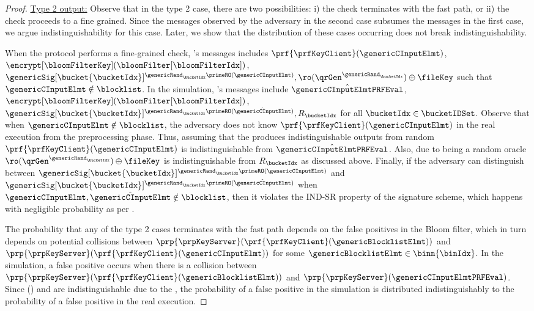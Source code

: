 \begin{proof}
\smallskip\noindent\underline{Type 2 output:} Observe that in the type 2 case, there are two possibilities: i) the check terminates with the fast path, or ii) the check proceeds to a fine grained. Since the messages observed by the adversary in the second case subsumes the messages in the first case, we argue indistinguishability for this case. Later, we show that the distribution of these cases occurring does not break indistinguishability. 

When the protocol performs a fine-grained check, \server's messages includes $ \prf{\prfKeyClient}(\genericCInputElmt)$, $\encrypt[\bloomFilterKey](\bloomFilter[\bloomFilterIdx])$, $\genericSig[\bucket{\bucketIdx}]^{\genericRand_\bucketIdx \primeRO(\genericCInputElmt)}, \ro(\qrGen^{\genericRand_\bucketIdx}) \oplus \fileKey$ such that $\genericCInputElmt \notin \blocklist$. In the
simulation, \server's messages include $\hat{\genericCInputElmtPRFEval}$, $\encrypt[\bloomFilterKey](\bloomFilter[\bloomFilterIdx])$, $\genericSig[\bucket{\bucketIdx}]^{\genericRand_\bucketIdx \primeRO(\hat{\genericCInputElmt})}, R_\bucketIdx$ for all $\bucketIdx \in \bucketIDSet$. Observe that when $\genericCInputElmt \notin \blocklist$, the adversary does not know $\prf{\prfKeyClient}(\genericCInputElmt)$ in the real execution from the preprocessing phase. Thus, assuming that the \prf produces indistinguishable outputs from random $\prf{\prfKeyClient}(\genericCInputElmt)$ is indistinguishable from $\hat{\genericCInputElmtPRFEval}$. Also, due to \ro being a random oracle $\ro(\qrGen^{\genericRand_\bucketIdx}) \oplus \fileKey$ is indistinguishable from $R_\bucketIdx$ as discussed above. Finally, if the adversary can distinguish between $\genericSig[\bucket{\bucketIdx}]^{\genericRand_\bucketIdx \primeRO(\genericCInputElmt)}$ and $\genericSig[\bucket{\bucketIdx}]^{\genericRand_\bucketIdx \primeRO(\hat{\genericCInputElmt})}$ when $\genericCInputElmt, \hat{\genericCInputElmt} \notin \blocklist$, then it violates the IND-SR property of the signature scheme, which happens with negligible probability as per . 

The probability that any of the type 2 cases terminates with the fast path depends on the false positives in the Bloom filter, which in turn depends on potential collisions between $\prp{\prpKeyServer}(\prf{\prfKeyClient}(\genericBlocklistElmt))$ and $\prp{\prpKeyServer}(\prf{\prfKeyClient}(\genericCInputElmt))$ for some $\genericBlocklistElmt \in \binn{\binIdx}$. In the simulation, a false positive occurs when there is a collision between  $\prp{\prpKeyServer}(\prf{\prfKeyClient}(\genericBlocklistElmt))$ and $\prp{\prpKeyServer}(\genericCInputElmtPRFEval)$. Since \prf{\prfKeyClient}(\genericBlocklistElmt) and \genericCInputElmtPRFEval are indistinguishable due to the \prf, the probability of a false positive in the simulation is distributed indistinguishably to the probability of a false positive in the real execution. 
\end{proof}
